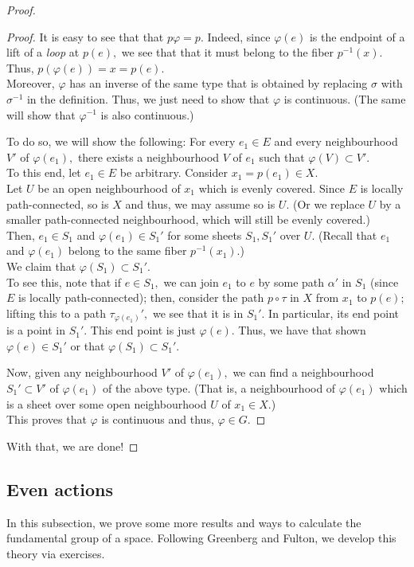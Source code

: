 \documentclass[12pt]{article}
\theoremstyle{definition}
\numberwithin{thm}{section}
\newenvironment{blockquote}
{\begin{mdframed}[skipabove=0pt, skipbelow=0pt, innertopmargin=4pt, innerbottommargin=4pt, bottomline=false,topline=false,rightline=false, linewidth=2pt]}
{\end{mdframed}}
\begin{document}
\begin{proof}
\begin{blockquote}
\begin{proof}
			It is easy to see that that $p\varphi = p.$ Indeed, since $\varphi(e)$ is the endpoint of a lift of a \emph{loop} at $p(e),$ we see that that it must belong to the fiber $p^{-1}(x).$ Thus, $p(\varphi(e)) = x = p(e).$\\
			Moreover, $\varphi$ has an inverse of the same type that is obtained by replacing $\sigma$ with $\sigma^{-1}$ in the definition. Thus, we just need to show that $\varphi$ is continuous. (The same will show that $\varphi^{-1}$ is also continuous.)

			To do so, we will show the following: For every $e_1 \in E$ and every neighbourhood $V'$ of $\varphi(e_1),$ there exists a neighbourhood $V$ of $e_1$ such that $\varphi(V) \subset V'.$\\
			To this end, let $e_1 \in E$ be arbitrary. Consider $x_1 = p(e_1) \in X.$\\
			Let $U$ be an open neighbourhood of $x_1$ which is evenly covered. Since $E$ is locally path-connected, so is $X$ and thus, we may assume so is $U.$ (Or we replace $U$ by a smaller path-connected neighbourhood, which will still be evenly covered.)\\
			Then, $e_1 \in S_1$ and $\varphi(e_1) \in S_1'$ for some sheets $S_1, S_1'$ over $U.$ (Recall that $e_1$ and $\varphi(e_1)$ belong to the same fiber $p^{-1}(x_1).$) \\
			We claim that $\varphi(S_1) \subset S_1'.$ \\
			To see this, note that if $e \in S_1,$ we can join $e_1$ to $e$ by some path $\alpha'$ in $S_1$ (since $E$ is locally path-connected); then, consider the path $p\circ \tau$ in $X$ from $x_1$ to $p(e);$ lifting this to a path $\tau_{\varphi(e_1)}',$ we see that it is in $S_1'.$ In particular, its end point is a point in $S_1'.$ This end point is just $\varphi(e).$ Thus, we have that shown $\varphi(e) \in S_1'$ or that $\varphi(S_1) \subset S_1'.$

			Now, given any neighbourhood $V'$ of $\varphi(e_1),$ we can find a neighbourhood $S_1' \subset V'$ of $\varphi(e_1)$ of the above type. (That is, a neighbourhood of $\varphi(e_1)$ which is a sheet over some open neighbourhood $U$ of $x_1 \in X.$)\\
			This proves that $\varphi$ is continuous and thus, $\varphi \in G.$
		\end{proof}
	\end{blockquote}
	With that, we are done!
\end{proof}
\subsection{Even actions}
In this subsection, we prove some more results and ways to calculate the fundamental group of a space. Following Greenberg and Fulton, we develop this theory via exercises.
\end{document}
